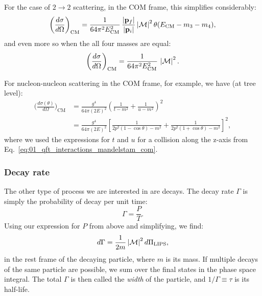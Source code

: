 For the case of $2 \rightarrow 2$ scattering, in the COM frame, this simplifies considerably:
\begin{equation}
	\label{eq:01_qft_interactions_cross_section_com}
	\bigg(\frac{d\sigma}{d\Omega}\bigg)_{\mathrm{CM}} = \frac{1}{64\pi^2E_{\mathrm{CM}}^2}\, \frac{\left\lvert \mathbf{p}_f \right\rvert}{\left\lvert \mathbf{p}_i \right\rvert} \left\lvert \mathcal M \right\rvert^2 \theta(E_{\mathrm{CM}} - m_3 - m_4),
\end{equation}
and even more so when the all four masses are equal:
\begin{equation}
	\label{eq:01_qft_interactions_cross_section_com_equal_mass}
	\bigg(\frac{d\sigma}{d\Omega}\bigg)_{\mathrm{CM}} = \frac{1}{64\pi^2E_{\mathrm{CM}}^2}\, \left\lvert \mathcal M \right\rvert^2.
\end{equation}

For nucleon-nucleon scattering in the COM frame, for example, we have (at tree level):
\begin{equation}
	\label{eq:01_qft_interactions_nn_scattering_cross_section}
	\begin{split}
		\bigg(\frac{d\sigma(\theta)}{d\Omega}\bigg)_{\mathrm{CM}} &= \frac{g^4}{64\pi (2E)^2} \left(\frac{1}{t - m^2} + \frac{1}{u - m^2}\right)^2 \\
		&= \frac{g^4}{64\pi (2E)^2} \left[\frac{1}{2p^2(1 - \cos\theta) - m^2} + \frac{1}{2p^2(1 + \cos\theta) - m^2}\right]^2,
	\end{split}
\end{equation}
where we used the expressions for $t$ and $u$ for a collision along the z-axis from Eq.~\ref{eq:01_qft_interactions_mandelstam_com}.

\subsubsection{Decay rate}

The other type of process we are interested in are decays.
The decay rate $\Gamma$ is simply the probability of decay per unit time:
\begin{equation}
	\label{eq:01_qft_interactions_decay_rate}
	\Gamma =  \frac{P}{T}.
\end{equation}
Using our expression for $P$ from above and simplifying, we find:
\begin{equation}
	\label{eq:01_qft_interactions_differential_decay_rate}
	d\Gamma = \frac{1}{2m} \left\lvert \mathcal M \right\rvert^2 d\Pi_{\mathrm{LIPS}},
\end{equation}
in the rest frame of the decaying particle, where $m$ is its mass.
If multiple decays of the same particle are possible, we sum over the final states in the phase space integral.
The total $\Gamma$ is then called the \textit{width} of the particle, and $1/\Gamma \equiv \tau$ is its half-life.

